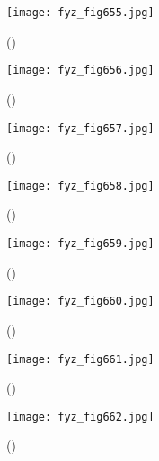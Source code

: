     \begin{figure}[ht!] %
      \centering
      \texttt{[image: fyz\_fig655.jpg]}
      \caption{
               (\cite[s.~707]{Feynman02})}
      \label{fyz_fig655}
    \end{figure}

    \begin{figure}[ht!] %
      \centering
      \texttt{[image: fyz\_fig656.jpg]}
      \caption{
               (\cite[s.~707]{Feynman02})}
      \label{fyz_fig656}
    \end{figure}

    \begin{figure}[ht!] %
      \centering
      \texttt{[image: fyz\_fig657.jpg]}
      \caption{
               (\cite[s.~707]{Feynman02})}
      \label{fyz_fig657}
    \end{figure}

    \begin{figure}[ht!] %
      \centering
      \texttt{[image: fyz\_fig658.jpg]}
      \caption{
               (\cite[s.~707]{Feynman02})}
      \label{fyz_fig658}
    \end{figure}

    \begin{figure}[ht!] %
      \centering
      \texttt{[image: fyz\_fig659.jpg]}
      \caption{
               (\cite[s.~707]{Feynman02})}
      \label{fyz_fig659}
    \end{figure}

    \begin{figure}[ht!] %
      \centering
      \texttt{[image: fyz\_fig660.jpg]}
      \caption{
               (\cite[s.~707]{Feynman02})}
      \label{fyz_fig660}
    \end{figure}

    \begin{figure}[ht!] %
      \centering
      \texttt{[image: fyz\_fig661.jpg]}
      \caption{
               (\cite[s.~707]{Feynman02})}
      \label{fyz_fig661}
    \end{figure}

    \begin{figure}[ht!] %
      \centering
      \texttt{[image: fyz\_fig662.jpg]}
      \caption{
               (\cite[s.~707]{Feynman02})}
      \label{fyz_fig662}
    \end{figure}

\printbibliography[title={Seznam literatury},heading=subbibliography]
